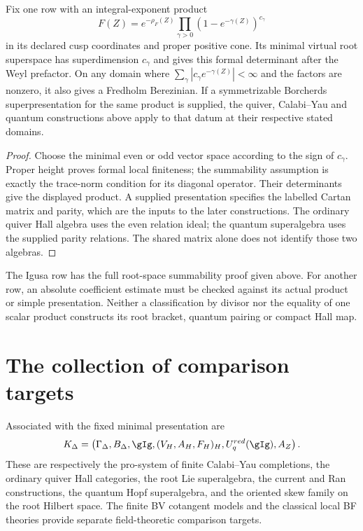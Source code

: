 \begin{proposition}
Fix one row with an integral-exponent product
\[
 F(Z)=e^{-\rho_F(Z)}\prod_{\gamma>0}(1-e^{-\gamma(Z)})^{c_\gamma}
\]
in its declared cusp coordinates and proper positive cone. Its
minimal virtual root superspace has superdimension \(c_\gamma\)
and gives this formal determinant after the Weyl prefactor. On any
domain where \(\sum_\gamma|c_\gamma e^{-\gamma(Z)}|<\infty\)
and the factors are nonzero, it also gives a Fredholm Berezinian.
If a symmetrizable Borcherds superpresentation for the same product
is supplied, the quiver, Calabi--Yau and quantum constructions above
apply to that datum at their respective stated domains.
\end{proposition}
\begin{proof}
Choose the minimal even or odd vector space according to the sign
of \(c_\gamma\). Proper height proves formal local finiteness;
the summability assumption is exactly the trace-norm condition for
its diagonal operator. Their determinants give the displayed
product. A supplied presentation specifies the labelled Cartan
matrix and parity, which are the inputs to the later constructions.
The ordinary quiver Hall algebra uses the even relation ideal;
the quantum superalgebra uses the supplied parity relations. The
shared matrix alone does not identify those two algebras.
\end{proof}

The Igusa row has the full root-space summability proof given above.
For another row, an absolute coefficient estimate must be checked
against its actual product or simple presentation. Neither a
classification by divisor nor the equality of one scalar product
constructs its root bracket, quantum pairing or compact Hall map.

\section{The collection of comparison targets}
\begin{definition}
Associated with the fixed minimal presentation are
\[
 \mathfrak K_\Delta=
 \left(\Gamma_\Delta,\mathcal B_\Delta,\gIg,
       (V_H,\mathcal A_H,\mathcal F_H)_H,
       U_q^{\mathrm{red}}(\gIg),\mathbb A_Z\right).
\]
These are respectively the pro-system of finite Calabi--Yau
completions, the ordinary quiver Hall categories, the root Lie
superalgebra, the current and Ran constructions, the quantum Hopf
superalgebra, and the oriented skew family on the root Hilbert space.
The finite BV cotangent models and the classical local BF theories
provide separate field-theoretic comparison targets.
\end{definition}

